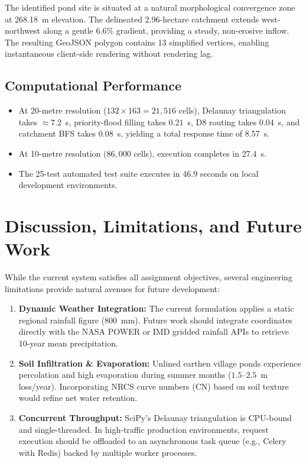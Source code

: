 \documentclass[manuscript,screen,review]{acmart}
\begin{document}
The identified pond site is situated at a natural morphological convergence zone at 268.18~m elevation.
The delineated 2.96-hectare catchment extends west-northwest along a gentle 6.6\% gradient, providing
a steady, non-erosive inflow. The resulting GeoJSON polygon contains 13 simplified vertices,
enabling instantaneous client-side rendering without rendering lag.

\subsection{Computational Performance}

\begin{itemize}
  \item At 20-metre resolution ($132 \times 163 = 21{,}516$ cells), Delaunay triangulation takes
    $\approx 7.2$~s, priority-flood filling takes $0.21$~s, D8 routing takes $0.04$~s, and catchment BFS takes $0.08$~s,
    yielding a total response time of 8.57~s.
  \item At 10-metre resolution ($86{,}000$ cells), execution completes in 27.4~s.
  \item The 25-test automated test suite executes in 46.9 seconds on local development environments.
\end{itemize}

\section{Discussion, Limitations, and Future Work}
\label{sec:discussion}

While the current system satisfies all assignment objectives, several engineering limitations provide
natural avenues for future development:
\begin{enumerate}
  \item \textbf{Dynamic Weather Integration:} The current formulation applies a static regional rainfall figure
    (800~mm). Future work should integrate coordinates directly with the NASA POWER or IMD gridded rainfall
    APIs to retrieve 10-year mean precipitation.
  \item \textbf{Soil Infiltration \& Evaporation:} Unlined earthen village ponds experience percolation
    and high evaporation during summer months ($1.5$--$2.5$~m loss/year). Incorporating NRCS curve numbers (CN)
    based on soil texture would refine net water retention.
  \item \textbf{Concurrent Throughput:} SciPy's Delaunay triangulation is CPU-bound and single-threaded.
    In high-traffic production environments, request execution should be offloaded to an asynchronous task
    queue (e.g., Celery with Redis) backed by multiple worker processes.
\end{enumerate}
\end{document}
